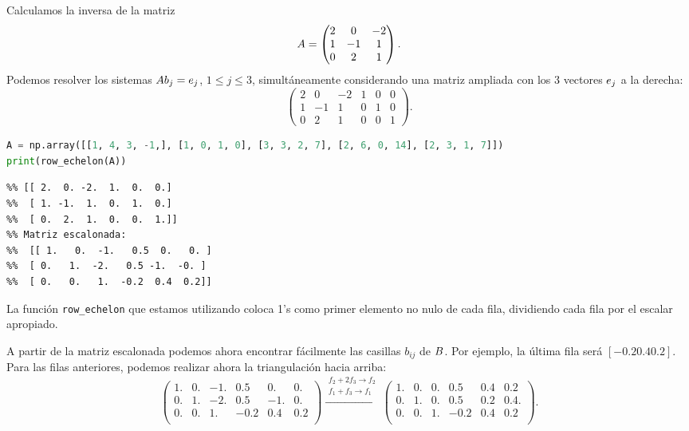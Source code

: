 \begin{ejemplo}
Calculamos la inversa de la matriz
$$
\Ab = \begin{pmatrix} 2 & 0 & -2 \\ 1 & -1 & 1 \\ 0 & 2 & 1\end{pmatrix}.
$$
Podemos resolver los sistemas $\Ab \bb_j = \eb_j$, $1 \le j \le 3$, simultáneamente considerando una matriz ampliada con los 3 vectores $\eb_j$ a la derecha:
$$
\left(\begin{array}{ccc|ccc} 2 & 0 & -2 & 1 & 0 & 0 \\ 1 & -1 & 1 & 0 & 1 & 0\\ 0 & 2 & 1 & 0 & 0 & 1\end{array}\right).
$$

\begin{Shaded}
\begin{lstlisting}[language=Python]
A = np.array([[1, 4, 3, -1,], [1, 0, 1, 0], [3, 3, 2, 7], [2, 6, 0, 14], [2, 3, 1, 7]])
print(row_echelon(A))
\end{lstlisting}
\end{Shaded}

\begin{verbatim}
%% [[ 2.  0. -2.  1.  0.  0.]
%%  [ 1. -1.  1.  0.  1.  0.]
%%  [ 0.  2.  1.  0.  0.  1.]]
%% Matriz escalonada:
%%  [[ 1.   0.  -1.   0.5  0.   0. ]
%%  [ 0.   1.  -2.   0.5 -1.  -0. ]
%%  [ 0.   0.   1.  -0.2  0.4  0.2]]
\end{verbatim}

La función \texttt{row\_echelon} que estamos utilizando coloca 1's como primer elemento no nulo de cada fila, dividiendo cada fila por el escalar apropiado.

A partir de la matriz escalonada podemos ahora encontrar fácilmente las casillas $b_{ij}$ de $\Bb$. Por ejemplo, la última fila será $[-0.2 0.4 0.2]$. Para las filas anteriores, podemos realizar ahora la triangulación hacia arriba: 
$$
\left(\begin{array}{ccc|ccc}
 1. &  0. & -1. &  0.5 &  0.  &  0.  \\
 0. &  1. & -2. &  0.5 & -1.  & 0.  \\
 0. &  0. &  1. & -0.2 &  0.4 &  0.2 \\
\end{array}\right)
\xrightarrow{\substack{f_2 + 2f_3 \rightarrow f_2 \\ f_1 + f_3 \rightarrow f_1}}
\left(\begin{array}{ccc|ccc}
 1. &  0. & 0. &  0.5 &  0.4  &  0.2  \\
 0. &  1. & 0. &  0.5 & 0.2  & 0.4.  \\
 0. &  0. &  1. & -0.2 &  0.4 &  0.2 \\
 \end{array}\right).
$$


\end{ejemplo}
